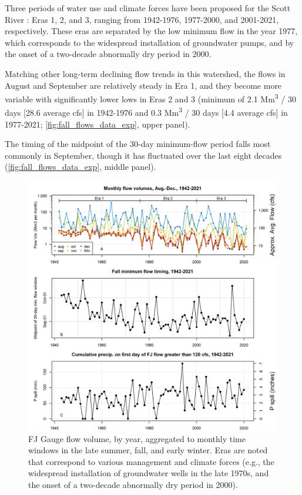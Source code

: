 \documentclass[hess, manuscript]{copernicus}
\begin{document}
Three periods of water use and climate forces have been proposed for the
Scott River \citep[e.g., by][]{Pyschik2022}: Eras 1, 2, and 3, ranging
from 1942-1976, 1977-2000, and 2001-2021, respectively. These eras are
separated by the low minimum flow in the year 1977, which corresponds to
the widespread installation of groundwater pumps, and by the onset of a
two-decade abnormally dry period in 2000.

Matching other long-term declining flow trends in this watershed, the
flows in August and September are relatively steady in Era 1, and they
become more variable with significantly lower lows in Eras 2 and 3
(minimum of 2.1 Mm\textsuperscript{3} / 30 days {[}28.6 average cfs{]}
in 1942-1976 and 0.3 Mm\textsuperscript{3} / 30 days {[}4.4 average
cfs{]} in 1977-2021; \autoref{fig:fall_flows_data_exp}, upper panel).

The timing of the midpoint of the 30-day minimum-flow period falls most
commonly in September, though it has fluctuated over the last eight
decades (\autoref{fig:fall_flows_data_exp}, middle panel).

\begin{figure}
\includegraphics[width=1\linewidth]{f06} \caption{\label{fig:fall_flows_data_exp} FJ Gauge flow volume, by year, aggregated to monthly time windows in the late summer, fall, and early winter. Eras are noted that correspond to various management and climate forces (e.g., the widespread installation of groundwater wells in the late 1970s, and the onset of a two-decade abnormally dry period in 2000). }\label{fig:fall_flows_data_exp}
\end{figure}
\end{document}
